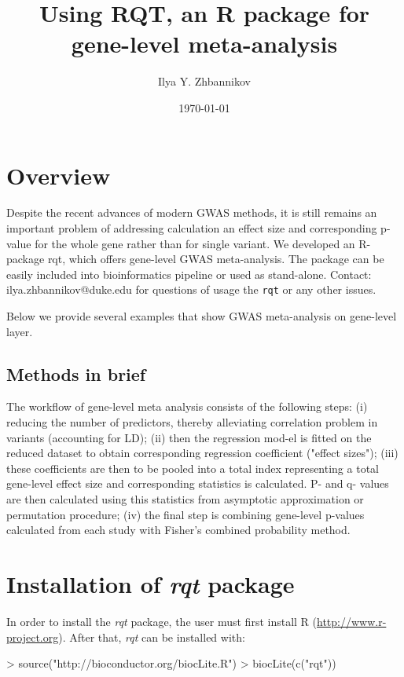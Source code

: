 \documentclass{article}
\title{Using RQT, an R package for gene-level meta-analysis}
\author{Ilya Y. Zhbannikov}
\date{\today}
\begin{document}

\maketitle

\section{Overview}

Despite the recent advances of modern GWAS methods, 
it is still remains an important problem of addressing 
calculation an effect size and corresponding p-value 
for the whole gene rather than for single variant. 
We developed an R-package rqt, which offers gene-level GWAS meta-analysis. 
The package can be easily included into bioinformatics pipeline 
or used as stand-alone. 
Contact: ilya.zhbannikov@duke.edu for questions of 
usage the \texttt{rqt} or any other issues.

Below we provide several examples that show GWAS 
meta-analysis on gene-level layer.

\subsection{Methods in brief}

The workflow of gene-level meta analysis consists of the following steps: 
(i) reducing the number of predictors, thereby alleviating 
correlation problem in variants (accounting for LD); 
(ii) then the regression mod-el is fitted on the reduced dataset 
to obtain corresponding regression coefficient ("effect sizes"); 
(iii) these coefficients are then to be pooled into a total index 
representing a total gene-level effect size and corresponding 
statistics is calculated. P- and q- values are then calculated 
using this statistics from asymptotic approximation or permutation 
procedure; (iv) the final step is combining gene-level p-values 
calculated from each study with Fisher's combined probability method.

\section{Installation of \emph{rqt} package}
In order to install the \emph{rqt} package, the user must first install R (\url{http://www.r-project.org}). After that, \emph{rqt} can be installed with:

\begin{Schunk}
\begin{Sinput}
> source("http://bioconductor.org/biocLite.R")
> biocLite(c("rqt"))
\end{Sinput}
\end{Schunk}
\end{document}
